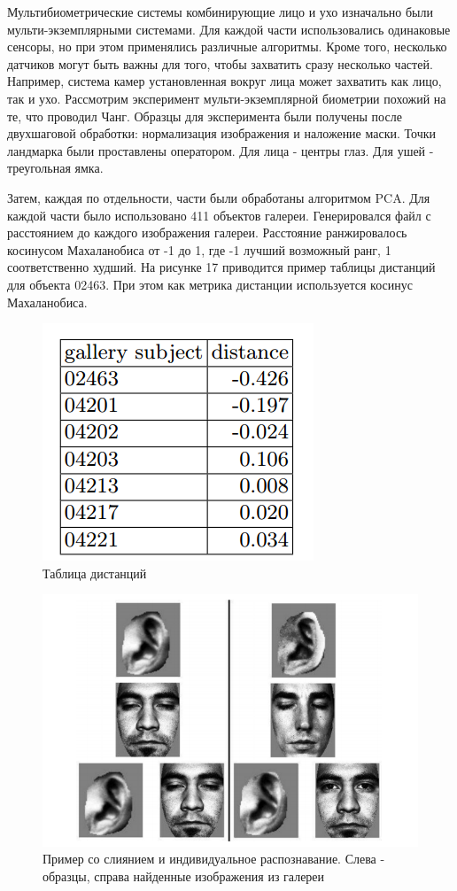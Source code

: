 \documentclass[12pt,a4paper]{article}					%
\begin{document}
Мультибиометрические системы комбинирующие лицо и ухо изначально были мульти-экземплярными системами.
Для каждой части использовались одинаковые сенсоры, но при этом применялись различные алгоритмы.
Кроме того, несколько датчиков могут быть важны для того, чтобы захватить сразу несколько частей.
Например, система камер установленная вокруг лица может захватить как лицо, так и ухо.
Рассмотрим эксперимент мульти-экземплярной биометрии похожий на те, что проводил Чанг.
Образцы для эксперимента были получены после двухшаговой обработки: нормализация изображения и наложение маски.
Точки ландмарка были проставлены оператором.
Для лица - центры глаз.
Для ушей - треугольная ямка.

Затем, каждая по отдельности, части были обработаны алгоритмом PCA.
Для каждой части было использовано 411 объектов галереи.
Генерировался файл с расстоянием до каждого изображения галереи.
Расстояние ранжировалось косинусом Махаланобиса от -1 до 1, где -1 лучший возможный ранг, 1 соответственно худший.
На рисунке 17 приводится пример таблицы дистанций для объекта 02463.
При этом как метрика дистанции используется косинус Махаланобиса.

\begin{figure}[h!]
\centering
\includegraphics[scale=0.60]{res/distances_table}
\caption{Таблица дистанций}
\end{figure}

\begin{figure}[h!]
\centering
\includegraphics[scale=1.0]{res/ex_individual_failed}
\caption{Пример со слиянием и индивидуальное распознавание. Слева - образцы, справа найденные изображения из галереи }
\end{figure}
\end{document}
